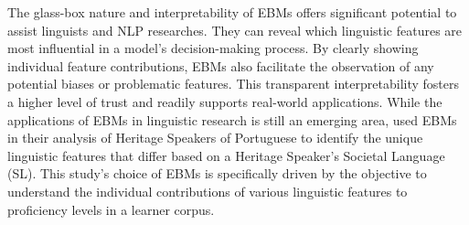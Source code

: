 The glass-box nature and interpretability of EBMs offers significant potential to assist linguists and NLP
researches. They can reveal
which linguistic
features are
most influential in a model's decision-making process. By clearly showing individual feature contributions, EBMs
also facilitate the observation of any potential biases or problematic features. This transparent interpretability
fosters a higher level of trust and readily supports real-world applications.
While the applications of EBMs in linguistic research is still an emerging area, \citet{akef2025} used EBMs in their
analysis of
Heritage Speakers of Portuguese to identify the unique linguistic features that differ based on a Heritage Speaker's
Societal Language (SL). This study's choice of EBMs is specifically driven by the objective to understand the
individual contributions of various linguistic features to proficiency levels in a learner corpus.